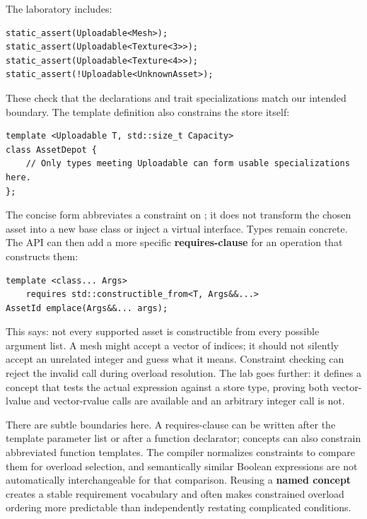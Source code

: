 The laboratory includes:

\begin{verbatim}
static_assert(Uploadable<Mesh>);
static_assert(Uploadable<Texture<3>>);
static_assert(Uploadable<Texture<4>>);
static_assert(!Uploadable<UnknownAsset>);
\end{verbatim}

These check that the declarations and trait specializations match our intended boundary. The template definition also constrains the store itself:

\begin{verbatim}
template <Uploadable T, std::size_t Capacity>
class AssetDepot {
    // Only types meeting Uploadable can form usable specializations here.
};
\end{verbatim}

The concise  form abbreviates a constraint on ; it does not transform the chosen asset into a new base class or inject a virtual interface. Types remain concrete. The API can then add a more specific \textbf{requires-clause} for an operation that constructs them:

\begin{verbatim}
template <class... Args>
    requires std::constructible_from<T, Args&&...>
AssetId emplace(Args&&... args);
\end{verbatim}

This says: not every supported asset is constructible from every possible argument list. A mesh might accept a vector of indices; it should not silently accept an unrelated integer and guess what it means. Constraint checking can reject the invalid call during overload resolution. The lab goes further: it defines a  concept that tests the actual expression against a store type, proving both vector-lvalue and vector-rvalue calls are available and an arbitrary integer call is not.

There are subtle boundaries here. A requires-clause can be written after the template parameter list or after a function declarator; concepts can also constrain abbreviated function templates. The compiler normalizes constraints to compare them for overload selection, and semantically similar Boolean expressions are not automatically interchangeable for that comparison. Reusing a \textbf{named concept} creates a stable requirement vocabulary and often makes constrained overload ordering more predictable than independently restating complicated conditions.

